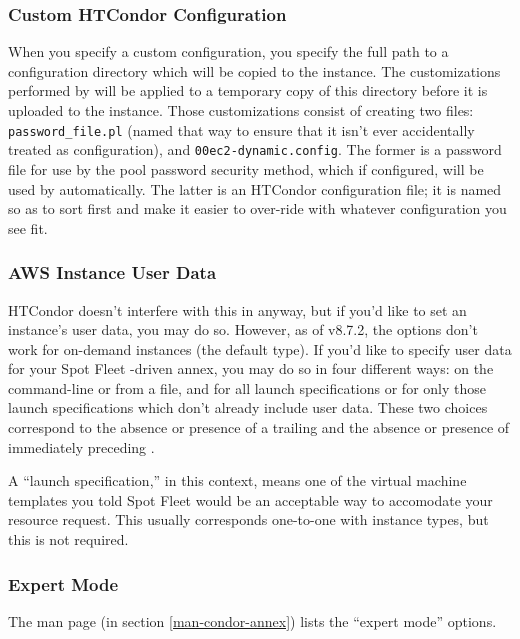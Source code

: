 \subsubsection{Custom HTCondor Configuration}

When you specify a custom configuration, you specify the full path to a
configuration directory which will be copied to the instance.  The customizations
performed by  will be applied to a temporary copy of this
directory before it is uploaded to the instance.  Those customizations
consist of creating two files: {\tt password\_file.pl} (named that way to ensure
that it isn't ever accidentally treated as configuration), and
{\tt 00ec2-dynamic.config}.  The former is a password file for use by the pool
password security method, which if configured, will be used by 
automatically.  The latter is an HTCondor configuration file; it is named
so as to sort first and make it easier to over-ride with whatever configuration
you see fit.

\subsubsection{AWS Instance User Data}

HTCondor doesn't interfere with this in anyway, but if you'd like to set
an instance's user data, you may do so.  However, as of v8.7.2, the
 options don't work for on-demand instances (the default
type).  If you'd like to specify user data for your Spot Fleet -driven
annex, you may do so in four different ways: on the command-line or
from a file, and for all launch specifications or for only those launch
specifications which don't already include user data.  These two choices
correspond to the absence or presence of a trailing  and the
absence or presence of  immediately preceding .

A ``launch specification,'' in this context, means one of the virtual machine
templates you told Spot Fleet would be an acceptable way to accomodate your
resource request.  This usually corresponds one-to-one with instance types,
but this is not required.

\subsubsection{Expert Mode}

The man page (in section \ref{man-condor-annex}) lists the ``expert
mode'' options.

